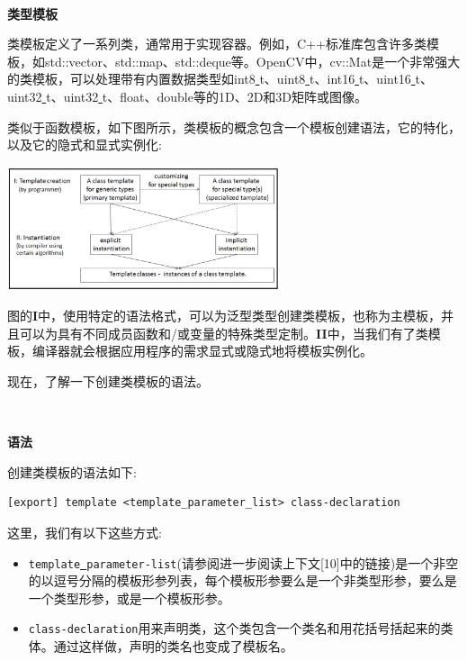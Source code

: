 \noindent\textbf{}\ \par
\textbf{类型模板} \ \par
类模板定义了一系列类，通常用于实现容器。例如，C++标准库包含许多类模板，如std::vector、std::map、std::deque等。OpenCV中，cv::Mat是一个非常强大的类模板，可以处理带有内置数据类型如int8\underline{ }t、uint8\underline{ }t、int16\underline{ }t、uint16\underline{ }t、uint32\underline{ }t、uint32\underline{ }t、float、double等的1D、2D和3D矩阵或图像。 \par
类似于函数模板，如下图所示，类模板的概念包含一个模板创建语法，它的特化，以及它的隐式和显式实例化: \par

\begin{center}
	\includegraphics[width=0.6\textwidth]{content/Section-1/Chapter-4/2}
\end{center}

图的\textbf{I}中，使用特定的语法格式，可以为泛型类型创建类模板，也称为主模板，并且可以为具有不同成员函数和/或变量的特殊类型定制。\textbf{II}中，当我们有了类模板，编译器就会根据应用程序的需求显式或隐式地将模板实例化。\par
现在，了解一下创建类模板的语法。 \par

\noindent\textbf{}\ \par
\textbf{语法} \ \par
创建类模板的语法如下: \par

\begin{lstlisting}[caption={}]
[export] template <template_parameter_list> class-declaration
\end{lstlisting}

这里，我们有以下这些方式: \par

\begin{itemize}
	\item \texttt{template\underline{ }parameter-list}(请参阅进一步阅读上下文[10]中的链接)是一个非空的以逗号分隔的模板形参列表，每个模板形参要么是一个非类型形参，要么是一个类型形参，或是一个模板形参。
	\item \texttt{class-declaration}用来声明类，这个类包含一个类名和用花括号括起来的类体。通过这样做，声明的类名也变成了模板名。
\end{itemize}

